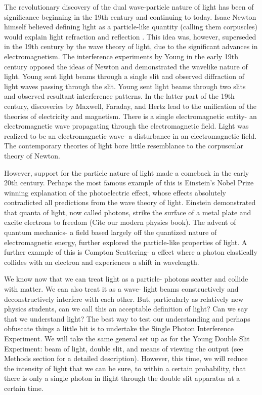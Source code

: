 \documentclass[prb,preprint]{revtex4-1}
\begin{document}
The revolutionary discovery of the dual wave-particle nature of light has been of significance beginning in the 19th century and continuing to today.  Isaac Newton himself believed defining light as a particle-like quantity (calling them corpuscles) would explain light refraction and reflection \cite{newton}.  This idea was, however, superseded in the 19th century by the wave theory of light, due to the significant advances in electromagnetism.  The interference experiments by Young in the early 19th century opposed the ideas of Newton and demonstrated the wavelike nature of light.  Young sent light beams through a single slit and observed diffraction of light waves passing through the slit.  Young sent light beams through two slits and observed resultant interference patterns.  In the latter part of the 19th century, discoveries by Maxwell, Faraday, and Hertz lead to the unification of the theories of electricity and magnetism.  There is a single electromagnetic entity- an electromagnetic wave propagating through the electromagnetic field.  Light was realized to be an electromagnetic wave- a disturbance in an electromagnetic field.  The contemporary theories of light bore little resemblance to the corpuscular theory of Newton.  \cite{david}

However, support for the particle nature of light made a comeback in the early 20th century.  Perhaps the most famous example of this is Einstein's Nobel Prize winning explanation of the photoelectric effect, whose effects absolutely contradicted all predictions from the wave theory of light.  Einstein demonstrated that quanta of light, now called photons, strike the surface of a metal plate and excite electrons to freedom (Cite our modern physics book).  The advent of quantum mechanics- a field based largely off the quantized nature of electromagnetic energy, further explored the particle-like properties of light.  A further example of this is Compton Scattering- a effect where a photon elastically collides with an electron and experiences a shift in wavelength.  

We know now that we can treat light as a particle- photons scatter and collide with matter.  We can also treat it as a wave- light beams constructively and deconstructively interfere with each other.  But, particularly as relatively new physics students, can we call this an acceptable definition of light?  Can we say that we understand light?  The best way to test our understanding and perhaps obfuscate things a little bit is to undertake the Single Photon Interference Experiment.  We will take the same general set up as for the Young Double Slit Experiment:  beam of light, double slit, and means of viewing the output (see Methods section for a detailed description).  However, this time, we will reduce the intensity of light that we can be sure, to within a certain probability, that there is only a single photon in flight through the double slit apparatus at a certain time.
\end{document}
